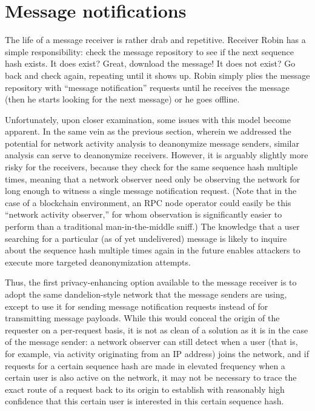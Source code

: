 \section{Message notifications}\label{message-notifications}

The life of a message receiver is rather drab and repetitive. Receiver Robin has a simple responsibility: check the message repository to see if the next sequence hash exists. It does exist? Great, download the message! It does not exist? Go back and check again, repeating until it shows up. Robin simply plies the message repository with ``message notification'' requests until he receives the message (then he starts looking for the next message) or he goes offline.

Unfortunately, upon closer examination, some issues with this model become apparent. In the same vein as the previous section, wherein we addressed the potential for network activity analysis to deanonymize message senders, similar analysis can serve to deanonymize receivers. However, it is arguably slightly more risky for the receivers, because they check for the same sequence hash multiple times, meaning that a network observer need only be observing the network for long enough to witness a single message notification request. (Note that in the case of a blockchain environment, an RPC node operator could easily be this ``network activity observer,'' for whom observation is significantly easier to perform than a traditional man-in-the-middle sniff.) The knowledge that a user searching for a particular (as of yet undelivered) message is likely to inquire about the sequence hash multiple times again in the future enables attackers to execute more targeted deanonymization attempts.

Thus, the first privacy-enhancing option available to the message receiver is to adopt the same dandelion-style network that the message senders are using, except to use it for sending message notification requests instead of for transmitting message payloads. While this would conceal the origin of the requester on a per-request basis, it is not as clean of a solution as it is in the case of the message sender: a network observer can still detect when a user (that is, for example, via activity originating from an IP address) joins the network, and if requests for a certain sequence hash are made in elevated frequency when a certain user is also active on the network, it may not be necessary to trace the exact route of a request back to its origin to establish with reasonably high confidence that this certain user is interested in this certain sequence hash.

